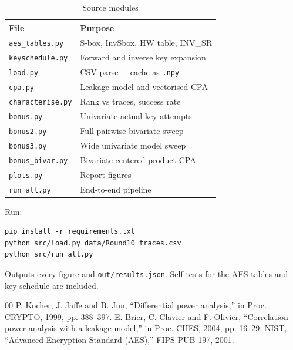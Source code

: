 \documentclass[conference,9pt]{IEEEtran}
\begin{document}
\begin{table}[t]
\centering
\caption{Source modules}
\label{tab:modules}
\footnotesize
\begin{tabular}{@{}p{}p{}@{}}
\toprule
File & Purpose\\
\midrule
\texttt{aes\_tables.py}    & S-box, InvSbox, HW table, INV\_SR\\
\texttt{keyschedule.py}    & Forward and inverse key expansion\\
\texttt{load.py}           & CSV parse + cache as \texttt{.npy}\\
\texttt{cpa.py}            & Leakage model and vectorised CPA\\
\texttt{characterise.py}   & Rank vs traces, success rate\\
\texttt{bonus.py}          & Univariate actual-key attempts\\
\texttt{bonus2.py}         & Full pairwise bivariate sweep\\
\texttt{bonus3.py}         & Wide univariate model sweep\\
\texttt{bonus\_bivar.py}   & Bivariate centered-product CPA\\
\texttt{plots.py}          & Report figures\\
\texttt{run\_all.py}       & End-to-end pipeline\\
\bottomrule
\end{tabular}
\end{table}

Run:
\begin{lstlisting}
pip install -r requirements.txt
python src/load.py data/Round10_traces.csv
python src/run_all.py
\end{lstlisting}
Outputs every figure and \texttt{out/results.json}. Self-tests for the AES tables and key schedule are included.

\begin{thebibliography}{00}
 P. Kocher, J. Jaffe and B. Jun, ``Differential power analysis,'' in Proc. CRYPTO, 1999, pp. 388--397.
 E. Brier, C. Clavier and F. Olivier, ``Correlation power analysis with a leakage model,'' in Proc. CHES, 2004, pp. 16--29.
 NIST, ``Advanced Encryption Standard (AES),'' FIPS PUB 197, 2001.
\end{thebibliography}
\end{document}
